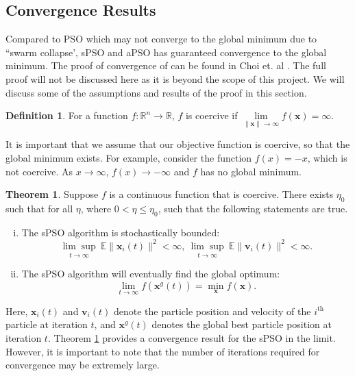 \documentclass[12pt]{article}
\newcommand{\mb}[1]{\mathbf{#1}}
\theoremstyle{definition}
\newtheorem{definition}{Definition}[section]
\newtheorem{theorem}{Theorem}[section]
\begin{document}
\subsection{Convergence Results}
\label{subsection:convergence results}
Compared to PSO which may not converge to the global minimum due to ``swarm collapse', sPSO and aPSO has guaranteed convergence to the global minimum. The proof of convergence of can be found in Choi et. al \cite{choi2020}. The full proof will not be discussed here as it is beyond the scope of this project. We will discuss some of the assumptions and results of the proof in this section.

\begin{definition}
For a function $f:\mathbb{R}^n \rightarrow \mathbb{R}$, $f$ is coercive if $\underset{\lVert \mb{x} \rVert \rightarrow \infty}\lim f(\mb{x}) = \infty$.
\end{definition}

It is important that we assume that our objective function is coercive, so that the global minimum exists. For example, consider the function  $f(x) = -x$, which is not coercive. As $x \rightarrow \infty$, $f(x) \rightarrow -\infty$ and $f$ has no global minimum.

\begin{theorem}
\label{theorem:spso convergence}
Suppose $f$ is a continuous function that is coercive. There exists $\eta_0$ such that for all $\eta$, where $0 < \eta \leq \eta_0$, such that the following statements are true.
\begin{enumerate}[(i)]
    \item The sPSO algorithm is stochastically bounded:
    $$\underset{t \rightarrow \infty}{\lim \sup} \ \mathbb{E} \lVert \mb{x}_i(t) \rVert^2 < \infty, \
    \underset{t \rightarrow \infty}{\lim \sup} \ \mathbb{E} \lVert \mb{v}_i(t) \rVert^2 < \infty.$$
    \item The sPSO algorithm will eventually find the global optimum:
    $$\underset{t \rightarrow \infty}{\lim} f(\mb{x}^g(t)) = \underset{\mb{x}}{\min} f(\mb{x}).$$
\end{enumerate}
\end{theorem}

Here, $\mb{x}_i(t)$ and $\mb{v}_i(t)$ denote the particle position and velocity of the $i^\text{th}$ particle at iteration $t$, and $\mb{x}^g(t)$ denotes the global best particle position at iteration $t$. Theorem \ref{theorem:spso convergence} provides a convergence result for the sPSO in the limit. However, it is important to note that the number of iterations required for convergence may be extremely large.
\end{document}
